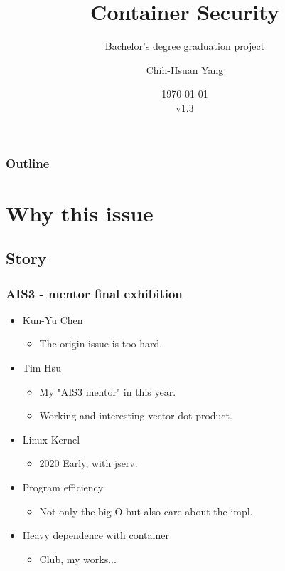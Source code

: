 \documentclass{beamer}
\title{Container Security}
\subtitle{Bachelor's degree graduation project}
\author{Chih-Hsuan Yang}
\institute{National Sun Yat-sen University}
\date{\today\\v1.3}
\begin{document}
\begin{frame}
    \titlepage
\end{frame}

\begin{frame}
    \frametitle{Outline}
    \tableofcontents
\end{frame}

\section{Why this issue}
\subsection{Story}
\begin{frame}
    \frametitle{AIS3 - mentor final exhibition}

    \begin{itemize}
        \item Kun-Yu Chen
              \begin{itemize}
                  \item The origin issue is too hard.
              \end{itemize}
        \item Tim Hsu
              \begin{itemize}
                  \item My "AIS3 mentor" in this year.
                  \item Working and interesting vector dot product.
              \end{itemize}
        \item Linux Kernel
              \begin{itemize}
                  \item 2020 Early, with jserv.
              \end{itemize}
        \item Program efficiency
              \begin{itemize}
                  \item Not only the big-O but also care about the impl.
              \end{itemize}
        \item Heavy dependence with container
              \begin{itemize}
                  \item Club, my works...
              \end{itemize}
    \end{itemize}

\end{frame}
\end{document}

